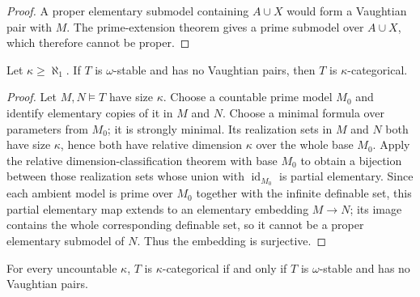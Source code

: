 \begin{proof}
A proper elementary submodel containing \(A\cup X\) would form a
Vaughtian pair with \(M\).  The prime-extension theorem gives a prime
submodel over \(A\cup X\), which therefore cannot be proper.
\end{proof}

\begin{theorem}
\label{thm:omega-stable-no-vaughtian-pairs-implies-uncountably-categorical}
Let \(\kappa\geq\aleph_1\).  If \(T\) is \(\omega\)-stable and has no
Vaughtian pairs, then \(T\) is \(\kappa\)-categorical.
\end{theorem}

\begin{proof}
Let \(M,N\models T\) have size \(\kappa\).  Choose a countable prime
model \(M_0\) and identify elementary copies of it in \(M\) and \(N\).
Choose a minimal formula over parameters from \(M_0\); it is strongly
minimal.  Its realization sets in \(M\) and \(N\) both have size
\(\kappa\), hence both have relative dimension \(\kappa\) over the
whole base \(M_0\).  Apply the relative dimension-classification theorem
with base \(M_0\) to obtain a bijection between those realization sets
whose union with \(\operatorname{id}_{M_0}\) is partial elementary.
Since each ambient model is prime over \(M_0\) together with the infinite
definable set, this partial elementary map extends to an elementary
embedding \(M\to N\); its image contains the whole corresponding
definable set, so it cannot be a proper elementary submodel of \(N\).
Thus the embedding is surjective.
\end{proof}

\begin{theorem}
\label{thm:baldwin-lachlan-characterization}
For every uncountable \(\kappa\), \(T\) is \(\kappa\)-categorical if and
only if \(T\) is \(\omega\)-stable and has no Vaughtian pairs.
\end{theorem}

